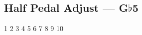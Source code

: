 \subsection{Half Pedal Adjust --- G$\flat$5}










































1
2
3
4
5
6
7
8
9
10
